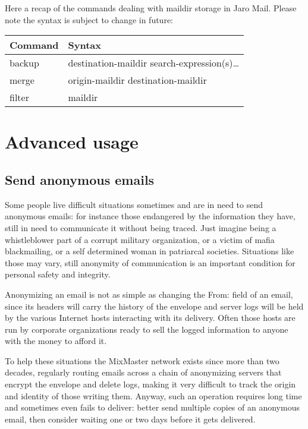 \documentclass[a4,onecolumn,portrait]{article}
\begin{document}
Here a recap of the commands dealing with maildir storage in Jaro Mail. Please note the syntax is subject to change in future:

\begin{center}
\begin{tabular}{ll}
Command & Syntax\\
\hline
backup & destination-maildir search-expression(s)\ldots{}\\
merge & origin-maildir destination-maildir\\
filter & maildir\\
\end{tabular}
\end{center}
\section{Advanced usage}
\label{sec-11}

\subsection{Send anonymous emails}
\label{sec-11-1}

Some people live difficult situations sometimes and are in need to
send anonymous emails: for instance those endangered by the
information they have, still in need to communicate it without
being traced. Just imagine being a whistleblower part of a corrupt
military organization, or a victim of mafia blackmailing, or a self
determined woman in patriarcal societies. Situations like those may
vary, still anonymity of communication is an important condition
for personal safety and integrity.

Anonymizing an email is not as simple as changing the From: field
of an email, since its headers will carry the history of the
envelope and server logs will be held by the various Internet hosts
interacting with its delivery. Often those hosts are run by
corporate organizations ready to sell the logged information to
anyone with the money to afford it.

To help these situations the MixMaster network exists since more
than two decades, regularly routing emails across a chain of
anonymizing servers that encrypt the envelope and delete logs,
making it very difficult to track the origin and identity of those
writing them. Anyway, such an operation requires long time and
sometimes even fails to deliver: better send multiple copies of an
anonymous email, then consider waiting one or two days before it
gets delivered.
\end{document}
